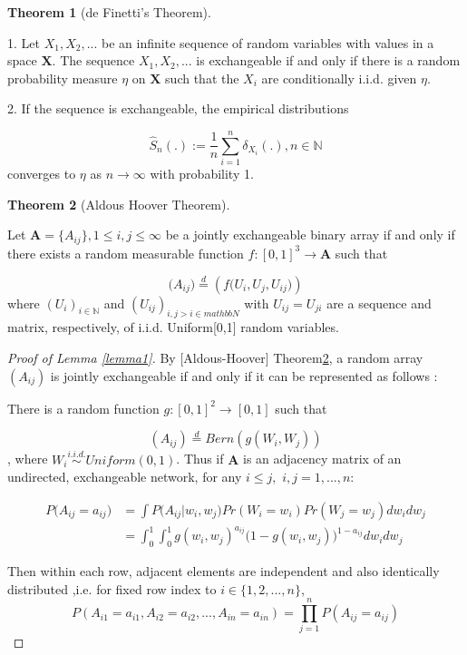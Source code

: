 \documentclass[12pt]{article}
\theoremstyle{definition}
\newtheorem{theorem}{Theorem}[section]
\begin{document}
\begin{theorem}[de Finetti's Theorem] 
\label{finetti}

1. Let $X_{1}, X_{2}, ...$ be an infinite sequence of random variables with values in a space $\mathbf{X}$. The sequence $X_{1}, X_{2}, ...$ is exchangeable if and only if there is a random probability measure $\eta$ on $\mathbf{X}$ such that the $X_{i}$ are conditionally i.i.d. given $\eta$. 

2. If the sequence is exchangeable, the empirical distributions

$$\hat{S}_{n} ( . ) := \frac{1}{n} \sum\limits_{i=1}^{n} \delta_{X_{i}} ( .), n \in \mathbb{N}$$
converges to $\eta$ as $n \rightarrow \infty$ with probability 1.
\end{theorem}

\begin{theorem}[Aldous Hoover Theorem]
	\label{Aldous_Hoover}

Let $\mathbf{A} = \{A_{ij}\}, 1 \leq i,j \leq \infty$ be a jointly exchangeable binary array if and only if there exists a random measurable function $f : [0,1]^{3} \rightarrow \mathbf{A}$ such that 

\begin{equation}
\big(  A_{ij}  \big) \stackrel{d}{=} \left( f \big( U_{i}, U_{j}, U_{ij} \big)  \right)
\end{equation}
where $(U_{i})_{i \in \mathbb{N}}$ and $(U_{ij})_{i,j > i \in mathbb{N}}$ with $U_{ij} = U_{ji}$ are a sequence and matrix, respectively, of i.i.d. Uniform[0,1] random variables. 
\end{theorem}



\begin{proof}[Proof of Lemma \ref{lemma1}]
By [Aldous-Hoover] Theorem\ref{Aldous_Hoover}, a random array $(A_{ij})$ is jointly exchangeable if and only if it can be represented as follows : 

There is a random function $g : [0,1]^2 \rightarrow [0,1]$ such that 

$$(A_{ij})  \stackrel{d}{=} Bern( g(W_{i}, W_{j}))$$
, where $W_{i} \overset{i.i.d.}{\sim} Uniform(0,1)$. Thus if $\mathbf{A}$ is an adjacency matrix of an undirected, exchangeable network, for any $i \leq j,$ $i,j = 1,... , n$:


\begin{equation}
\begin{split}
P \big(  A_{ij} = a_{ij} \big) & = \int P \big( A_{ij} \big| w_{i}, w_{j} \big) Pr(W_{i} = w_{i}) Pr(W_{j} = w_{j}) dw_{i} dw_{j} \\ & = \int_{0}^{1} \int_{0}^{1} g( w_{i},  w_{j})^{a_{ij}} \big( 1- g( w_{i},  w_{j}) \big)^{1-a_{ij}} dw_{i} dw_{j} 
\end{split}
\end{equation}

Then within each row, adjacent elements are independent and also identically distributed ,i.e. for fixed row index to $i \in \{1,2,... , n\}$,
$$P(A_{i1} = a_{i1}, A_{i2} = a_{i2}, ... , A_{in} = a_{in} ) = \prod\limits_{j=1}^{n} P(A_{ij} = a_{ij})$$

\end{proof}
\end{document}
